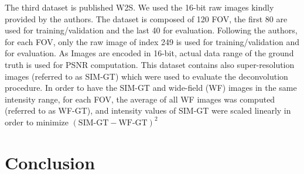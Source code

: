 \documentclass[review]{cvpr}
\begin{document}
The third dataset is published W2S. We used the 16-bit raw images kindly provided by the authors. The dataset is composed of 120 FOV, the first 80 are used for training/validation and the last 40 for evaluation. Following the authors, for each FOV, only the raw image of index 249 is used for training/validation and for evaluation. As Images are encoded in 16-bit, actual data range of the ground truth is used for PSNR computation.  
This dataset contains also super-resolution images (referred to as SIM-GT) which were used to evaluate the deconvolution procedure. In order to have the SIM-GT and wide-field (WF) images in the same intensity range, for each FOV, the average of all WF images was computed (referred to as WF-GT), and intensity values of SIM-GT were scaled linearly in order to minimize 
$( \textrm{SIM-GT} - \textrm{WF-GT})^2$

\section{Conclusion}



{\small


}
\end{document}
